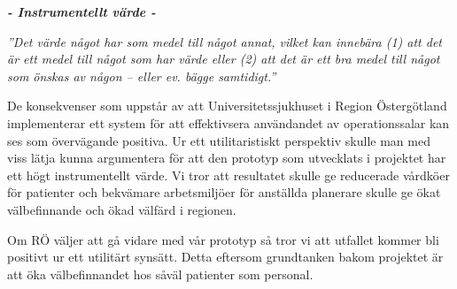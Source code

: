 \begin{minipage}{1\linewidth}
\begin{center}
\textbf{\textit{- Instrumentellt värde -}}

\emph{''Det värde något har som medel till något annat, vilket kan innebära (1) att det är ett medel till något som har värde eller (2) att det är ett bra medel till något som önskas av någon – eller ev. bägge samtidigt.''} \cite{ne}

\end{center}
\end{minipage}

De konsekvenser som uppstår av att Universitetssjukhuset i Region Östergötland implementerar ett system för att effektivsera användandet av operationssalar kan ses som övervägande positiva. Ur ett utilitaristiskt perspektiv skulle man med viss lätja kunna argumentera för att den prototyp som utvecklats i projektet har ett högt instrumentellt värde. Vi tror att resultatet skulle ge reducerade vårdköer för patienter och bekvämare arbetsmiljöer för anställda planerare skulle ge ökat välbefinnande och ökad välfärd i regionen.

Om RÖ väljer att gå vidare med vår prototyp så tror vi att utfallet kommer bli positivt ur ett utilitärt synsätt. Detta eftersom grundtanken bakom projektet är att öka välbefinnandet hos såväl patienter som personal.
